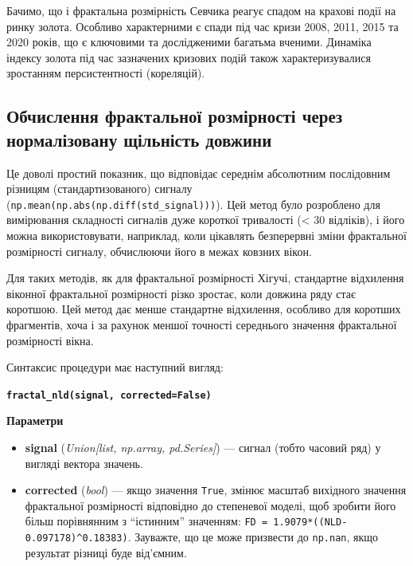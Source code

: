 \documentclass[
  letterpaper,
]{report}
\providecommand{\tightlist}{%
  \setlength{\itemsep}{0pt}\setlength{\parskip}{0pt}}\usepackage{longtable,booktabs,array}
\begin{document}
Бачимо, що і фрактальна розмірність Севчика реагує спадом на крахові
події на ринку золота. Особливо характерними є спади під час кризи 2008,
2011, 2015 та 2020 років, що є ключовими та дослідженими багатьма
вченими. Динаміка індексу золота під час зазначених кризових подій також
характеризувалися зростанням персистентності (кореляцій).

\hypertarget{ux43eux431ux447ux438ux441ux43bux435ux43dux43dux44f-ux444ux440ux430ux43aux442ux430ux43bux44cux43dux43eux457-ux440ux43eux437ux43cux456ux440ux43dux43eux441ux442ux456-ux447ux435ux440ux435ux437-ux43dux43eux440ux43cux430ux43bux456ux437ux43eux432ux430ux43dux443-ux449ux456ux43bux44cux43dux456ux441ux442ux44c-ux434ux43eux432ux436ux438ux43dux438}{%
\subsection{Обчислення фрактальної розмірності через нормалізовану
щільність
довжини}\label{ux43eux431ux447ux438ux441ux43bux435ux43dux43dux44f-ux444ux440ux430ux43aux442ux430ux43bux44cux43dux43eux457-ux440ux43eux437ux43cux456ux440ux43dux43eux441ux442ux456-ux447ux435ux440ux435ux437-ux43dux43eux440ux43cux430ux43bux456ux437ux43eux432ux430ux43dux443-ux449ux456ux43bux44cux43dux456ux441ux442ux44c-ux434ux43eux432ux436ux438ux43dux438}}

Це доволі простий показник, що відповідає середнім абсолютним
послідовним різницям (стандартизованого) сигналу
(\texttt{np.mean(np.abs(np.diff(std\_signal)))}). Цей метод було
розроблено для вимірювання складності сигналів дуже короткої тривалості
(\textless{} 30 відліків), і його можна використовувати, наприклад, коли
цікавлять безперервні зміни фрактальної розмірності сигналу, обчислюючи
його в межах ковзних вікон.

Для таких методів, як для фрактальної розмірності Хігучі, стандартне
відхилення віконної фрактальної розмірності різко зростає, коли довжина
ряду стає коротшою. Цей метод дає менше стандартне відхилення, особливо
для коротших фрагментів, хоча і за рахунок меншої точності середнього
значення фрактальної розмірності вікна.

Синтаксис процедури має наступний вигляд:

\textbf{\texttt{fractal\_nld(signal,\ corrected=False)}}

\textbf{Параметри}

\begin{itemize}
\tightlist
\item
  \textbf{signal} (\emph{Union{[}list, np.array, pd.Series{]}}) ---
  сигнал (тобто часовий ряд) у вигляді вектора значень.
\item
  \textbf{corrected} (\emph{bool}) --- якщо значення \texttt{True},
  змінює масштаб вихідного значення фрактальної розмірності відповідно
  до степеневої моделі, щоб зробити його більш порівнянним з
  ``істинним'' значенням:
  \texttt{FD\ =\ 1.9079*((NLD-0.097178)\^{}0.18383)}. Зауважте, що це
  може призвести до \texttt{np.nan}, якщо результат різниці буде
  від'ємним.
\end{itemize}
\end{document}
